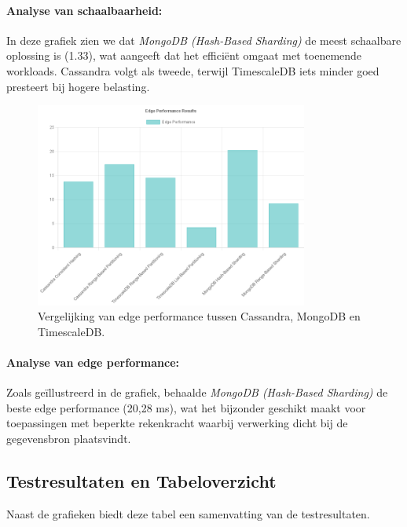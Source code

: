 \paragraph{Analyse van schaalbaarheid:}
In deze grafiek zien we dat \textit{MongoDB (Hash-Based Sharding)} de meest schaalbare oplossing is (1.33), wat aangeeft dat het efficiënt omgaat met toenemende workloads. Cassandra volgt als tweede, terwijl TimescaleDB iets minder goed presteert bij hogere belasting.

\begin{figure}[H]
    \centering
    \includegraphics[width=0.8\textwidth]{Edge_Performance.png}
    \caption{Vergelijking van edge performance tussen Cassandra, MongoDB en TimescaleDB.}
    \label{fig:edgeperformance-comparison}
\end{figure}

\paragraph{Analyse van edge performance:}
Zoals geïllustreerd in de grafiek, behaalde \textit{MongoDB (Hash-Based Sharding)} de beste edge performance (20,28 ms), wat het bijzonder geschikt maakt voor toepassingen met beperkte rekenkracht waarbij verwerking dicht bij de gegevensbron plaatsvindt.

\subsection{Testresultaten en Tabeloverzicht}
Naast de grafieken biedt deze tabel een samenvatting van de testresultaten.

